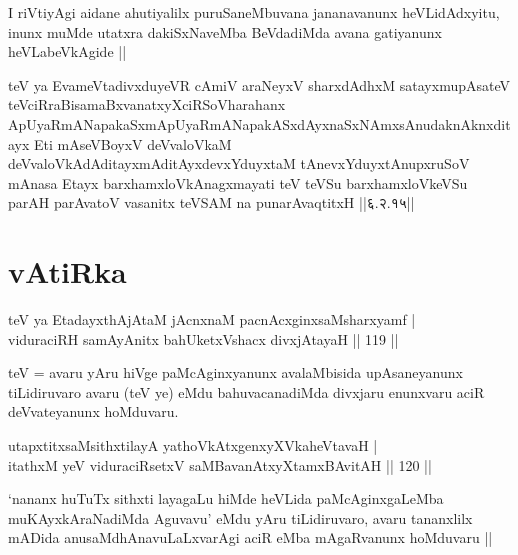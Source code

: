 \begin{artha}
I riVtiyAgi aidane ahutiyalilx puruSaneMbuvana jananavanunx
heVLidAdxyitu, inunx muMde utatxra dakiSxNaveMba BeVdadiMda avana
gatiyanunx heVLabeVkAgide ||
\end{artha}

\begin{shl}
teV ya EvameVtadivxduyeVR cAmiV araNeyxV sharxdAdhxM satayxmupAsateV teV\s ciRraBisamaBxvanatxyXciRSoV\s harahanx ApUyaRmANapakaSxmApUyaRmANapakASxdAyxnaSxNAmxsAnudaknAknxditayx Eti mAseVBoyxV deVvaloVkaM deVvaloVkAdAditayxmAditAyxdevxYduyxtaM tAnevxYduyxtAnupxruSoV mAnasa Etayx barxhamxloVkAnagxmayati teV teVSu barxhamxloVkeVSu parAH parAvatoV vasanitx teVSAM na punarAvaqtitxH ||६.२.१५||
\end{shl}


\section*{vAtiRka}


\begin{shl}
teV ya EtadayxthAjAtaM jAcnxnaM pacnAcxginxsaMsharxyamf | \\
viduraciRH samAyAnitx bahUketxVshacx divxjAtayaH \hfill|| 119 || 
\end{shl}

\begin{artha}
teV = avaru yAru hiVge paMcAginxyanunx avalaMbisida upAsaneyanunx
tiLidiruvaro avaru (teV ye) eMdu bahuvacanadiMda divxjaru enunxvaru
aciR deVvateyanunx hoMduvaru.
\end{artha}

\begin{shl}
utapxtitxsaMsithxtilayA yathoVkAtxgenxyXVkaheVtavaH | \\
itathxM yeV viduraciRsetxV saMBavanAtxyXtamxBAvitAH \hfill|| 120 || 
\end{shl}

\begin{artha}
`nananx huTuTx sithxti layagaLu hiMde heVLida paMcAginxgaLeMba
muKAyxkAraNadiMda Aguvavu' eMdu yAru tiLidiruvaro, avaru tananxlilx
mADida anusaMdhAnavuLaLxvarAgi aciR eMba mAgaRvanunx hoMduvaru ||
\end{artha}


